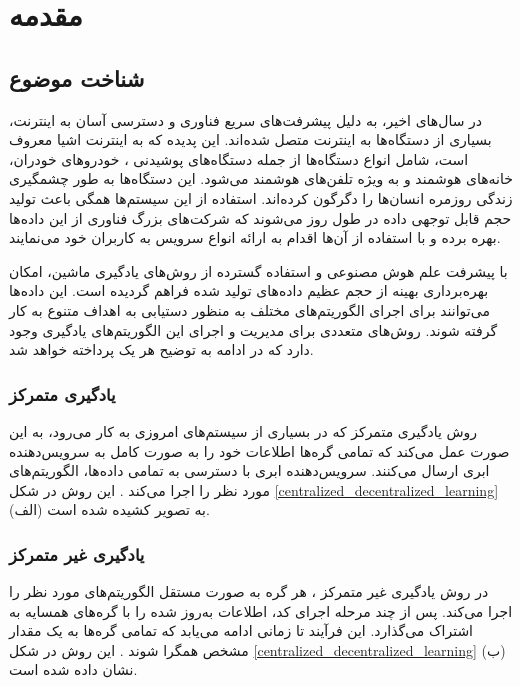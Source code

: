 \chapter{مقدمه}

\section{شناخت موضوع}
در سال‌های اخیر، به دلیل پیشرفت‌های سریع فناوری و دسترسی آسان به اینترنت، بسیاری از دستگاه‌ها به اینترنت متصل شده‌اند. این پدیده که به اینترنت اشیا%
معروف است، شامل انواع دستگاه‌ها از جمله دستگاه‌های پوشیدنی%
%
، خودروهای خودران، خانه‌های هوشمند%
و به ویژه تلفن‌های هوشمند%
می‌شود. این دستگاه‌ها به طور چشمگیری زندگی روزمره انسان‌ها را دگرگون کرده‌اند. استفاده از این سیستم‌ها همگی باعث تولید حجم قابل توجهی داده در طول روز می‌شوند که شرکت‌های بزرگ فناوری از این داده‌ها بهره برده و با استفاده از آن‌ها اقدام به ارائه انواع سرویس به کاربران خود می‌نمایند.

با پیشرفت علم هوش مصنوعی و استفاده گسترده از روش‌های یادگیری ماشین، امکان بهره‌برداری بهینه از حجم عظیم داده‌های تولید شده فراهم گردیده است. این داده‌ها می‌توانند برای اجرای الگوریتم‌های مختلف به منظور دستیابی به اهداف متنوع به کار گرفته شوند. روش‌های متعددی برای مدیریت و اجرای این الگوریتم‌های یادگیری وجود دارد که در ادامه به توضیح هر یک پرداخته خواهد شد.


\subsection{یادگیری متمرکز}
روش یادگیری متمرکز%
که در بسیاری از سیستم‌های امروزی به کار می‌رود، به این صورت عمل می‌کند که تمامی گره‌ها%
اطلاعات خود را به صورت کامل به سرویس‌دهنده ابری%
ارسال می‌کنند. سرویس‌دهنده ابری با دسترسی به تمامی داده‌ها، الگوریتم‌های مورد نظر را اجرا می‌کند
\cite{elbir2022family}.
این روش در شکل
\ref{centralized_decentralized_learning}%
(الف) به تصویر کشیده شده است.


\subsection{یادگیری غیر متمرکز}
در روش یادگیری غیر متمرکز%
، هر گره به صورت مستقل الگوریتم‌های مورد نظر را اجرا می‌کند. پس از چند مرحله اجرای کد، اطلاعات به‌روز شده را با گره‌های همسایه به اشتراک می‌گذارد. این فرآیند تا زمانی ادامه می‌یابد که تمامی گره‌ها به یک مقدار مشخص همگرا شوند
\cite{zhou2019edge}.
این روش در شکل
\ref{centralized_decentralized_learning}%
(ب) نشان داده شده است.

